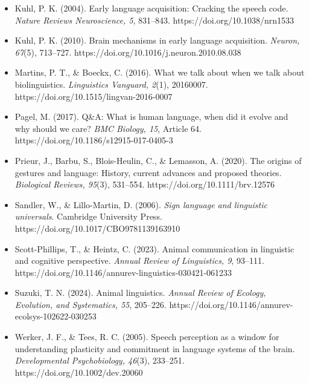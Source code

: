 \documentclass[12pt]{article}
\begin{document}
\begin{itemize}
    \item Kuhl, P. K. (2004). Early language acquisition: Cracking the speech code. \textit{Nature Reviews Neuroscience, 5}, 831--843. https://doi.org/10.1038/nrn1533
    \item Kuhl, P. K. (2010). Brain mechanisms in early language acquisition. \textit{Neuron, 67}(5), 713--727. https://doi.org/10.1016/j.neuron.2010.08.038
    \item Martins, P. T., \& Boeckx, C. (2016). What we talk about when we talk about biolinguistics. \textit{Linguistics Vanguard, 2}(1), 20160007. https://doi.org/10.1515/lingvan-2016-0007
    \item Pagel, M. (2017). Q\&A: What is human language, when did it evolve and why should we care? \textit{BMC Biology, 15}, Article 64. https://doi.org/10.1186/s12915-017-0405-3
    \item Prieur, J., Barbu, S., Blois-Heulin, C., \& Lemasson, A. (2020). The origins of gestures and language: History, current advances and proposed theories. \textit{Biological Reviews, 95}(3), 531--554. https://doi.org/10.1111/brv.12576
    \item Sandler, W., \& Lillo-Martin, D. (2006). \textit{Sign language and linguistic universals}. Cambridge University Press. https://doi.org/10.1017/CBO9781139163910
    \item Scott-Phillips, T., \& Heintz, C. (2023). Animal communication in linguistic and cognitive perspective. \textit{Annual Review of Linguistics, 9}, 93--111. https://doi.org/10.1146/annurev-linguistics-030421-061233
    \item Suzuki, T. N. (2024). Animal linguistics. \textit{Annual Review of Ecology, Evolution, and Systematics, 55}, 205--226. https://doi.org/10.1146/annurev-ecolsys-102622-030253
    \item Werker, J. F., \& Tees, R. C. (2005). Speech perception as a window for understanding plasticity and commitment in language systems of the brain. \textit{Developmental Psychobiology, 46}(3), 233--251. https://doi.org/10.1002/dev.20060

\end{itemize}
\end{document}
